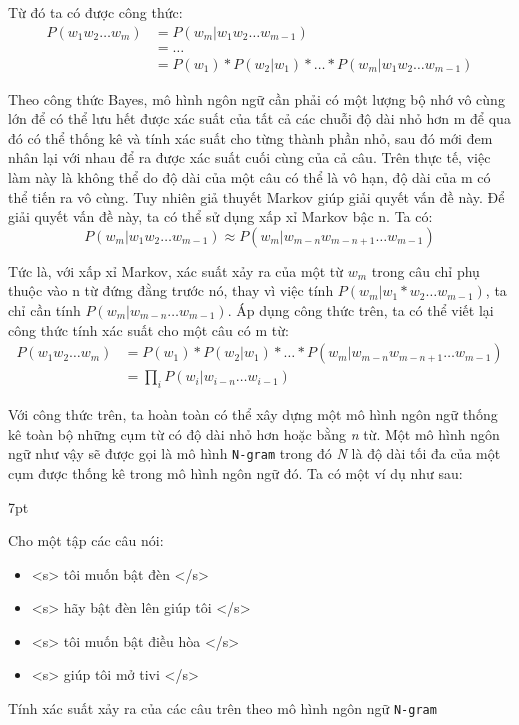 \documentclass[12pt]{report}
\newenvironment{formal}{%
  \def\FrameCommand{%
    \hspace{1pt}%
    {\color{mygray}\vrule width 6pt}%
    {\color{lightgray}\vrule width 4pt}%
    \colorbox{lightgray}%
  }%
  \MakeFramed{\advance\hsize-\width\FrameRestore}%
  \noindent\hspace{-4.55pt}%
  \begin{adjustwidth}{}{7pt}%
  \vspace{2pt}\vspace{2pt}%
}
{%
  \vspace{2pt}\end{adjustwidth}\endMakeFramed%
}
\begin{document}
Từ đó ta có được công thức:
\begin{align*}
	P(w_1w_2 \ldots w_m) &= P(w_m|w_1w_2 \ldots w_{m-1}) \\
						&= \ldots \\
						&= P(w_1)*P(w_2|w_1)* \ldots *P(w_m|w_1w_2 \ldots w_{m-1})
\end{align*}

Theo công thức Bayes, mô hình ngôn ngữ cần phải có một lượng bộ nhớ vô cùng lớn để có thể lưu hết được xác suất của tất cả các chuỗi độ dài nhỏ hơn m để qua đó có thể thống kê và tính xác suất cho từng thành phần nhỏ, sau đó mới đem nhân lại với nhau để ra được xác suất cuối cùng của cả câu. Trên thực tế, việc làm này là không thể do độ dài của một câu có thể là vô hạn, độ dài của m có thể tiến ra vô cùng. Tuy nhiên giả thuyết Markov giúp giải quyết vấn đề này.
Để giải quyết vấn đề này, ta có thể sử dụng xấp xỉ Markov bậc n. Ta có:
\[P(w_m|w_1w_2 \ldots w_{m-1}) \approx P(w_m|w_{m-n}w_{m-n+1} \ldots w_{m-1})\]

Tức là, với xấp xỉ Markov, xác suất xảy ra của một từ $w_m$ trong câu chỉ phụ thuộc vào n từ đứng đằng trước nó, thay vì việc tính $P(w_m|w_1*w_2 \ldots w_{m-1})$, ta chỉ cần tính $P(w_m|w_{m-n} \ldots w_{m-1})$. Áp dụng công thức trên, ta có thể viết lại công thức tính xác suất cho một câu có m từ:
\begin{equation} \label{eq:markov}
	\begin{aligned} 
	P(w_1w_2 \ldots w_m) &= P(w_1)*P(w_2|w_1)* \ldots *P(w_m|w_{m-n}w_{m-n+1} \ldots w_{m-1}) \\
						&= \prod_{i}{P(w_i|w_{i-n} \ldots w_{i-1})}
	\end{aligned}
\end{equation}

Với công thức trên, ta hoàn toàn có thể xây dựng một mô hình ngôn ngữ thống kê toàn bộ những cụm từ có độ dài nhỏ hơn hoặc bằng \textit{n} từ. Một mô hình ngôn ngữ như vậy sẽ được gọi là mô hình \texttt{N-gram} trong đó \textit{N} là độ dài tối đa của một cụm được thống kê trong mô hình ngôn ngữ đó. Ta có một ví dụ như sau:

\begin{formal} 
Cho một tập các câu nói:
	\begin{itemize}
		\item <s> tôi muốn bật đèn </s>
		\item <s> hãy bật đèn lên giúp tôi </s>
		\item <s> tôi muốn bật điều hòa </s>
		\item <s> giúp tôi mở tivi </s>
	\end{itemize} 
Tính xác suất xảy ra của các câu trên theo mô hình ngôn ngữ \texttt{N-gram}
\label{fm:ex}
\end{formal}
\end{document}

